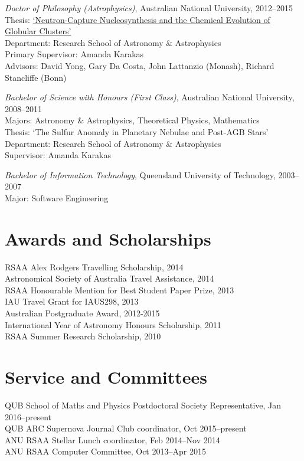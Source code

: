 \documentclass[11pt]{res} %
\begin{document}
\begin{resume}
  {\it Doctor of Philosophy (Astrophysics)}, Australian National University, 2012--2015\\
  Thesis: \href{https://openresearch-repository.anu.edu.au/handle/1885/16507}{`Neutron-Capture Nucleosynthesis and the Chemical Evolution of Globular Clusters'}\\
  Department: Research School of Astronomy \& Astrophysics\\
  Primary Supervisor: Amanda Karakas\\
  Advisors: David Yong, Gary Da Costa, John Lattanzio (Monash), Richard Stancliffe (Bonn)

  {\it Bachelor of Science with Honours (First Class)}, Australian National University, 2008--2011\\
  Majors: Astronomy \& Astrophysics, Theoretical Physics, Mathematics\\
  Thesis: `The Sulfur Anomaly in Planetary Nebulae and Post-AGB Stars'\\
  Department: Research School of Astronomy \& Astrophysics\\
  Supervisor: Amanda Karakas


  {\it Bachelor of Information Technology}, Queensland University of Technology, 2003--2007\\
  Major: Software Engineering

\section{Awards and Scholarships}
  RSAA Alex Rodgers Travelling Scholarship, 2014\\
  Astronomical Society of Australia Travel Assistance, 2014\\
  RSAA Honourable Mention for Best Student Paper Prize, 2013\\
  IAU Travel Grant for IAUS298, 2013\\
  Australian Postgraduate Award, 2012-2015\\
  International Year of Astronomy Honours Scholarship, 2011\\
  RSAA Summer Research Scholarship, 2010

\section{Service and Committees}
	QUB School of Maths and Physics Postdoctoral Society Representative, Jan 2016--present\\
	QUB ARC Supernova Journal Club coordinator, Oct 2015--present\\
	ANU RSAA Stellar Lunch coordinator, Feb 2014--Nov 2014\\
	ANU RSAA Computer Committee, Oct 2013--Apr 2015


\end{resume}
\end{document}
